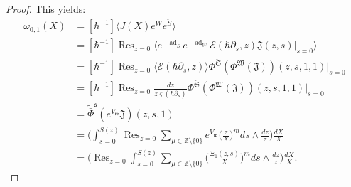 \documentclass[10pt,a4paper,oneside,no-math,reqno]{amsart}%
\theoremstyle{plain}
\theoremstyle{definition}
\theoremstyle{remark}
\numberwithin{equation}{section}
\newcommand{\mb}[1]{\mathbb{#1}}
\newcommand{\mf}[1]{\mathfrak{#1}}
\newcommand{\mc}[1]{\mathcal{#1}}
\newcommand{\1}{\mathds{1}}
\newcommand{\Z}{\mb{Z}}
\newcommand{\<}{\langle}
\renewcommand{\>}{\rangle}
\newcommand{\del}{\partial}
\DeclareMathOperator*{\Res}{Res}
\DeclareMathOperator{\ad}{ad}
\begin{document}
\begin{proof}
    This yields:
    \begin{equation}
        \begin{split}
            \omega_{0,1}(X)
            &=
            [\hbar^{-1}] \Big\< J(X) e^{W} e^{\check{S}} \Big\>
            \\
            &=
            [\hbar^{-1}] \Res_{z = 0} \Big\< e^{-\ad_{\check{S}}} e^{-\ad_W} \mc{E}( \hbar \del_s, z) \mf{J}(z,s) \Big|_{s = 0} \Big\> 
            \\
            &=
            [\hbar^{-1}] \Res_{z = 0} \Big\< \mc{E}( \hbar \del_s, z) \Big\> \Phi^{\check{\mf{S}}} (\Phi^{\mf{W}} (\mf{J}))(z,s, 1, 1) \Big|_{s = 0} 
            \\
            &=
            [\hbar^{-1}] \Res_{z = 0} \frac{dz}{z \varsigma (\hbar \del_s)} \Phi^{\check{\mf{S}}} (\Phi^{\mf{W}} (\mf{J}))(z,s, 1, 1) \Big|_{s = 0}
            \\
            &=
            \tilde{\bar{\Phi}}^{\mf{s}}(e^{V_{\mf{w}}} \mf{J} )(z,s, 1)
            \\
            &=
            \Big( \int_{s=0}^{S(z)} \Res_{z=0} \sum_{\mu \in \Z \setminus \{ 0\} } e^{V_\mf{w}} \big( \frac{z}{X} \big)^m ds \wedge \frac{dz}{z} \Big) \frac{dX}{X}
            \\
            &=
            \Big( \Res_{z = 0}  \int_{s = 0}^{S(z)} \sum_{\mu \in \Z \setminus \{ 0\} } \big( \frac{\Xi_1(z,s )}{X} \big)^m ds \wedge\frac{dz}{z  } \Big) \frac{dX}{X}.

\end{split}
\end{equation}
\end{proof}
\end{document}
